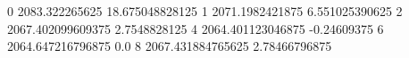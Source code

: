 0 2083.322265625 18.675048828125
1 2071.1982421875 6.551025390625
2 2067.402099609375 2.7548828125
4 2064.401123046875 -0.24609375
6 2064.647216796875 0.0
8 2067.431884765625 2.78466796875
